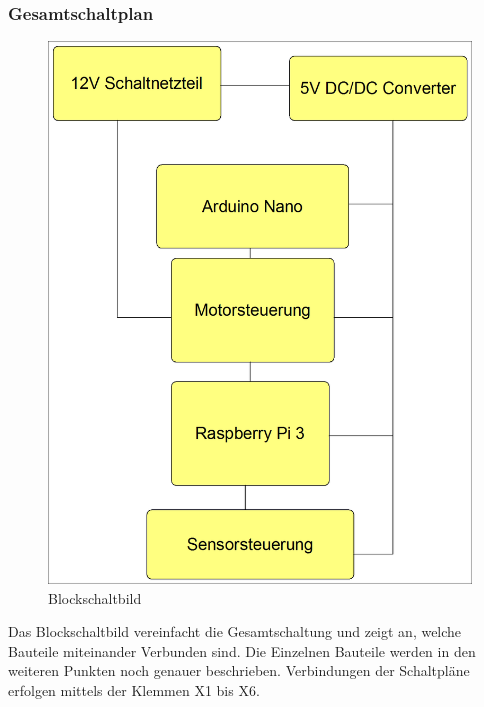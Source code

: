 \subsubsection{Gesamtschaltplan}
\begin{figure}[H] 
\begin{center}

\includegraphics[width=12cm]{Bilder/Schaltplan/Blockschaltbild}
\caption{Blockschaltbild}
\label{Blockschaltbild}

\end{center}
\end{figure}

Das Blockschaltbild vereinfacht die Gesamtschaltung und zeigt an, welche Bauteile miteinander Verbunden sind. Die Einzelnen Bauteile werden in den weiteren Punkten noch genauer beschrieben.
Verbindungen der Schaltpläne erfolgen mittels der Klemmen X1 bis X6.
 
